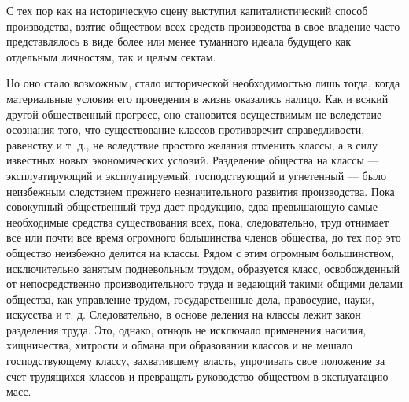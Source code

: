 \documentclass[12pt]{article}
\newcommand{\parnum}{(\arabic{parcount})}
\newcounter{parcount}
\newenvironment{parnumbers}{%
  \par%
  \everypar{\noindent \stepcounter{parcount}\marginpar[]{\parnum}}%
}{}
\begin{document}
\begin{parnumbers}
    С тех пор как на историческую сцену выступил капиталистический способ производства, взятие обществом всех средств производства в свое владение часто представлялось в виде более или менее туманного идеала будущего как отдельным личностям, так и целым сектам.

    Но оно стало возможным, стало исторической необходимостью лишь тогда, когда материальные условия его проведения в жизнь оказались налицо. Как и всякий другой общественный прогресс, оно становится осуществимым не вследствие осознания того, что существование классов противоречит справедливости, равенству и т. д., не вследствие простого желания отменить классы, а в силу известных новых экономических условий. Разделение общества на классы — эксплуатирующий и эксплуатируемый, господствующий и угнетенный — было неизбежным следствием прежнего незначительного развития производства. Пока совокупный общественный труд дает продукцию, едва превышающую самые необходимые средства существования всех, пока, следовательно, труд отнимает все или почти все время огромного большинства членов общества, до тех пор это общество неизбежно делится на классы. Рядом с этим огромным большинством, исключительно занятым подневольным трудом, образуется класс, освобожденный от непосредственно производительного труда и ведающий такими общими делами общества, как управление трудом, государственные дела, правосудие, науки, искусства и т. д. Следовательно, в основе деления на классы лежит закон разделения труда. Это, однако, отнюдь не исключало применения насилия, хищничества, хитрости и обмана при образовании классов и не мешало господствующему классу, захватившему власть, упрочивать свое положение за счет трудящихся классов и превращать руководство обществом в эксплуатацию масс.


\end{parnumbers}
\end{document}
